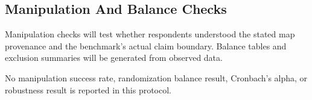 \subsection{Manipulation And Balance Checks}

Manipulation checks will test whether respondents understood the stated map
provenance and the benchmark's actual claim boundary. Balance tables and
exclusion summaries will be generated from observed data.

No manipulation success rate, randomization balance result, Cronbach's alpha,
or robustness result is reported in this protocol.
